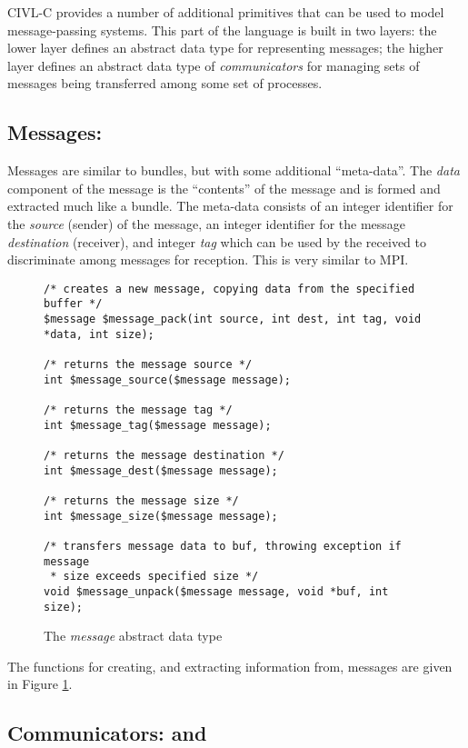 CIVL-C provides a number of additional primitives that can be used to
model message-passing systems.  This part of the language is built in
two layers: the lower layer defines an abstract data type for
representing messages; the higher layer defines an abstract data type
of \emph{communicators} for managing sets of messages being
transferred among some set of processes.

\subsection{Messages: \cmessage}

Messages are similar to bundles, but with some additional
``meta-data''.  The \emph{data} component of the message is the
``contents'' of the message and is formed and extracted much like a
bundle.  The meta-data consists of an integer identifier for the
\emph{source} (sender) of the message, an integer identifier for the
message \emph{destination} (receiver), and integer \emph{tag} which
can be used by the received to discriminate among messages for
reception.  This is very similar to MPI.

\begin{figure}
  \begin{small}
\begin{verbatim}
/* creates a new message, copying data from the specified buffer */ 
$message $message_pack(int source, int dest, int tag, void *data, int size);

/* returns the message source */ 
int $message_source($message message);

/* returns the message tag */
int $message_tag($message message);

/* returns the message destination */ 
int $message_dest($message message);

/* returns the message size */ 
int $message_size($message message);

/* transfers message data to buf, throwing exception if message
 * size exceeds specified size */ 
void $message_unpack($message message, void *buf, int size);
\end{verbatim}
  \end{small}
  \caption{The \emph{message} abstract data type}
  \label{fig:message}
\end{figure}

The functions for creating, and extracting information from, messages
are given in Figure \ref{fig:message}.

\subsection{Communicators: \cgcomm{} and \ccomm}
\label{sec:communicators}

